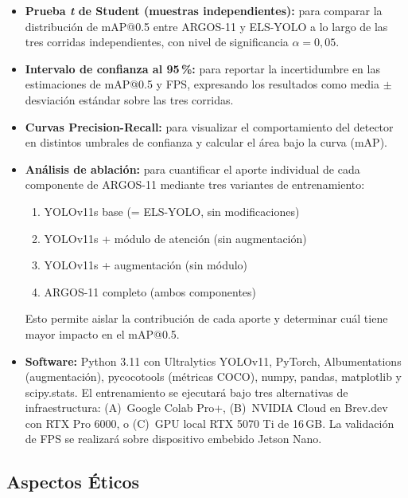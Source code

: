 \begin{itemize}
  \item \textbf{Prueba \textit{t} de Student (muestras
        independientes):} para comparar la distribuci\'on de
        mAP@0.5 entre ARGOS-11 y ELS-YOLO a lo largo de las tres
        corridas independientes, con nivel de significancia
        $\alpha = 0{,}05$.

  \item \textbf{Intervalo de confianza al 95\,\%:} para reportar
        la incertidumbre en las estimaciones de mAP@0.5 y FPS,
        expresando los resultados como media $\pm$ desviaci\'on
        est\'andar sobre las tres corridas.

  \item \textbf{Curvas Precision-Recall:} para visualizar el
        comportamiento del detector en distintos umbrales de
        confianza y calcular el \'area bajo la curva (mAP).

  \item \textbf{An\'alisis de ablaci\'on:} para cuantificar el
        aporte individual de cada componente de ARGOS-11 mediante
        tres variantes de entrenamiento:
        \begin{enumerate}
          \item YOLOv11s base (= ELS-YOLO, sin modificaciones)
          \item YOLOv11s + m\'odulo de atenci\'on (sin augmentaci\'on)
          \item YOLOv11s + augmentaci\'on (sin m\'odulo)
          \item ARGOS-11 completo (ambos componentes)
        \end{enumerate}
        Esto permite aislar la contribuci\'on de cada aporte y
        determinar cu\'al tiene mayor impacto en el mAP@0.5.

  \item \textbf{Software:} Python 3.11 con Ultralytics YOLOv11,
        PyTorch, Albumentations (augmentaci\'on), pycocotools
        (m\'etricas COCO), numpy, pandas, matplotlib y
        scipy.stats. El entrenamiento se ejecutar\'a bajo tres
        alternativas de infraestructura: (A)~Google Colab Pro+,
        (B)~NVIDIA Cloud en Brev.dev con RTX Pro 6000, o
        (C)~GPU local RTX 5070 Ti de 16\,GB. La validaci\'on de
        FPS se realizar\'a sobre dispositivo embebido Jetson Nano.
\end{itemize}

\subsection{Aspectos \'Eticos}


